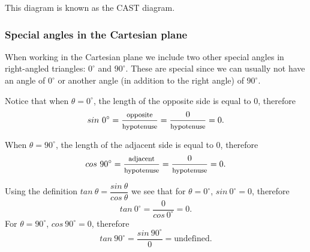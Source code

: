 This diagram is known as the CAST diagram.
\par
{}

\subsubsection{Special angles in the Cartesian plane}
When working in the Cartesian plane we include two other special
angles in right-angled triangles: $0^{\circ}$ and $90^{\circ}$. These
are special since we can usually not have an angle of $0^{\circ}$ or
another angle (in addition to the right angle) of $90^{\circ}$.

Notice that when $\theta = 0^{\circ}$, the length of the opposite side
is equal to $0$, therefore
\begin{equation*}
  sin~ 0^{\circ} =
  \dfrac{\mbox{\footnotesize opposite}}{\mbox{\footnotesize hypotenuse}} =
  \dfrac{0}{\mbox{\footnotesize hypotenuse}} =
  0.
\end{equation*}

When $\theta = 90^{\circ}$, the length of the adjacent side is equal
to $0$, therefore
\begin{equation*}
  cos~ 90^{\circ} =
  \dfrac{\mbox{\footnotesize adjacent}}{\mbox{\footnotesize hypotenuse}} =
  \dfrac{0}{\mbox{\footnotesize hypotenuse}} =
  0.
\end{equation*}

Using the definition $tan~ \theta=\dfrac{sin~ \theta}{cos~ \theta}$ we
see that for $\theta =  0^{\circ}$, $sin~ 0^{\circ}=0$, therefore
\begin{equation*}
  tan~ 0^{\circ} =
  \dfrac{0}{cos~ 0^{\circ}} =
  0.
\end{equation*}
For $\theta =  90^{\circ}$, $cos~ 90^{\circ}=0$, therefore
\begin{equation*}
  tan~ 90^{\circ} =
  \dfrac{sin~ 90^{\circ}}{0} =
  \mbox{undefined.}
\end{equation*}

